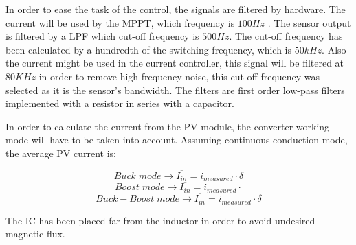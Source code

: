 In order to ease the task of the control, the signals are filtered by hardware. The current will be used by the MPPT, which frequency is $100 Hz$ . The sensor output is filtered by a LPF which cut-off frequency is $500 Hz$. The cut-off frequency has been calculated by a hundredth of the switching frequency, which is $50 kHz$. Also the current might be used in the current controller, this signal will be filtered at $80 KHz$ in order to remove high frequency noise, this cut-off frequency was selected as it is the sensor's bandwidth. The filters are first order low-pass filters implemented with a resistor in series with a capacitor.

In order to calculate the current from the PV module, the converter working mode will have to be taken into account. Assuming continuous conduction mode, the average PV current is:


\begin{equation} 
	Buck \; mode \rightarrow \overline{I_{in}} = i_{measured} \cdot \delta
\end{equation}
\begin{equation} 
Boost \; mode \rightarrow \overline{I_{in}} = i_{measured} \cdot
\end{equation}
\begin{equation} 
Buck-Boost \; mode \rightarrow \overline{I_{in}} = i_{measured} \cdot \delta
\end{equation}

The IC has been placed far from the inductor in order to avoid undesired magnetic flux.

